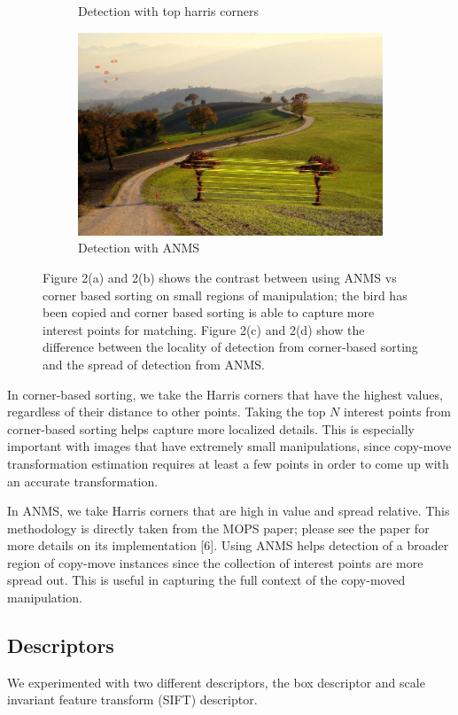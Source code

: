 \documentclass[12pt]{article}
\begin{document}
\begin{figure}
\begin{subfigure}{.5\textwidth}
  \caption{Detection with top harris corners}
  \label{fig:sub1}
\end{subfigure}%
\begin{subfigure}{.5\textwidth}
  \centering
  \includegraphics[width=.8\linewidth]{./gfx/ip_anms.jpg}
  \caption{Detection with ANMS}
  \label{fig:sub2}
\end{subfigure}
\caption{Figure 2(a) and 2(b) shows the contrast between using ANMS vs corner based sorting on small regions of manipulation; the bird has been copied and corner based sorting is able to capture more interest points for matching. Figure 2(c) and 2(d) show the difference between the locality of detection from corner-based sorting and the spread of detection from ANMS.}
\label{fig:test}
\end{figure}

In corner-based sorting, we take the Harris corners that have the highest values, regardless of their distance to other points. Taking the top $N$ interest points from corner-based sorting helps capture more localized details. This is especially important with images that have extremely small manipulations, since copy-move transformation estimation requires at least a few points in order to come up with an accurate transformation.

In ANMS, we take Harris corners that are high in value and spread relative. This methodology is directly taken from the MOPS paper; please see the paper for more details on its implementation [6]. Using ANMS helps detection of a broader region of copy-move instances since the collection of interest points are more spread out. This is useful in capturing the full context of the copy-moved manipulation.

\subsection*{Descriptors}
We experimented with two different descriptors, the box descriptor and scale invariant feature transform (SIFT) descriptor.
\end{document}

